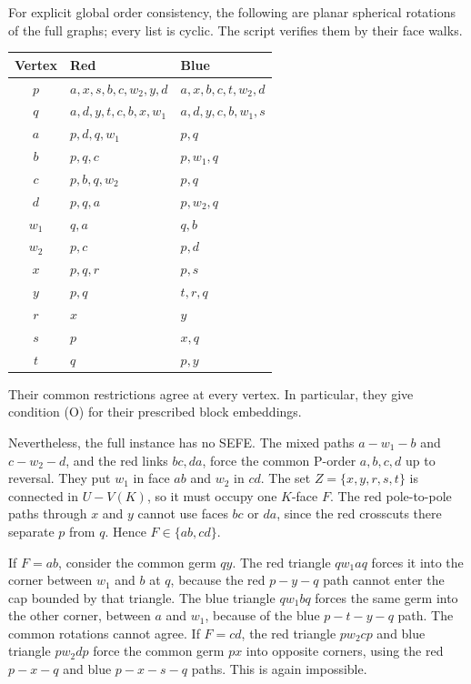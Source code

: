 For explicit global order consistency, the following are planar spherical
rotations of the full graphs; every list is cyclic. The script verifies
them by their face walks.
\begin{center}
\begin{tabular}{c l l}
\toprule
Vertex & Red & Blue \\
\midrule
$p$ & $a,x,s,b,c,w_2,y,d$ & $a,x,b,c,t,w_2,d$ \\
$q$ & $a,d,y,t,c,b,x,w_1$ & $a,d,y,c,b,w_1,s$ \\
$a$ & $p,d,q,w_1$ & $p,q$ \\
$b$ & $p,q,c$ & $p,w_1,q$ \\
$c$ & $p,b,q,w_2$ & $p,q$ \\
$d$ & $p,q,a$ & $p,w_2,q$ \\
$w_1$ & $q,a$ & $q,b$ \\
$w_2$ & $p,c$ & $p,d$ \\
$x$ & $p,q,r$ & $p,s$ \\
$y$ & $p,q$ & $t,r,q$ \\
$r$ & $x$ & $y$ \\
$s$ & $p$ & $x,q$ \\
$t$ & $q$ & $p,y$ \\
\bottomrule
\end{tabular}
\end{center}
Their common restrictions agree at every vertex. In particular, they give
condition (O) for their prescribed block embeddings.

Nevertheless, the full instance has no SEFE. The mixed paths $a-w_1-b$
and $c-w_2-d$, and the red links $bc,da$, force the common P-order
$a,b,c,d$ up to reversal. They put $w_1$ in face $ab$ and $w_2$ in $cd$.
The set $Z=\{x,y,r,s,t\}$ is connected in $U-V(K)$, so it must occupy
one $K$-face $F$. The red pole-to-pole paths through $x$ and $y$ cannot
use faces $bc$ or $da$, since the red crosscuts there separate $p$ from
$q$. Hence $F\in\{ab,cd\}$.

If $F=ab$, consider the common germ $qy$. The red triangle $qw_1aq$
forces it into the corner between $w_1$ and $b$ at $q$, because the
red $p-y-q$ path cannot enter the cap bounded by that triangle.
The blue triangle $qw_1bq$ forces the same germ into the other corner,
between $a$ and $w_1$, because of the blue $p-t-y-q$ path. The common
rotations cannot agree. If $F=cd$, the red triangle $pw_2cp$ and blue
triangle $pw_2dp$ force the common germ $px$ into opposite corners,
using the red $p-x-q$ and blue $p-x-s-q$ paths. This is again impossible.

